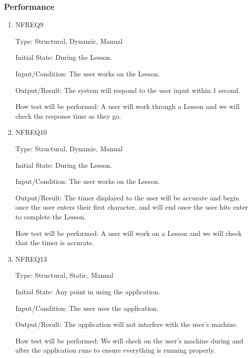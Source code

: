 \documentclass[12pt, titlepage]{article}
\begin{document}
\subsubsection{Performance}
\begin{enumerate}

\item{NFREQ9\\}

Type: Structural, Dynamic, Manual
					
Initial State: During the Lesson.
					
Input/Condition: The user works on the Lesson.
					
Output/Result: The system will respond to the user input within 1 second.
					
How test will be performed: A user will work through a Lesson and we will check the response time as they go. 

\item{NFREQ10\\}

Type: Structural, Dynamic, Manual
					
Initial State: During the Lesson.
					
Input/Condition: The user works on the Lesson.
					
Output/Result: The timer displayed to the user will be accurate and begin once the user enters their first character, and will end once the user hits enter to complete the Lesson.
					
How test will be performed: A user will work on a Lesson and we will check that the timer is accurate.

\item{NFREQ13\\}

Type: Structural, Static, Manual
					
Initial State: Any point in using the application.
					
Input/Condition: The user uses the application.
					
Output/Result: The application will not interfere with the user's machine.
					
How test will be performed: We will check on the user's machine during and after the application runs to ensure everything is running properly.

\end{enumerate}
\end{document}
